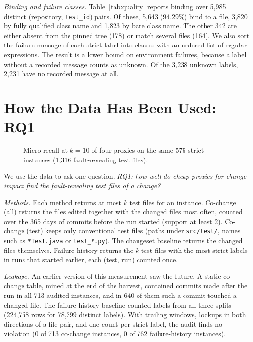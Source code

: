 \documentclass[10pt,conference]{IEEEtran}
\begin{document}
\textit{Binding and failure classes.} Table~\ref{tab:quality} reports binding over 5,985 distinct (repository, \texttt{test\_id}) pairs. Of these, 5,643 (94.29\%) bind to a file, 3,820 by fully qualified class name and 1,823 by bare class name. The other 342 are either absent from the pinned tree (178) or match several files (164). We also sort the failure message of each strict label into classes with an ordered list of regular expressions. The result is a lower bound on environment failures, because a label without a recorded message counts as unknown. Of the 3,238 unknown labels, 2,231 have no recorded message at all.

\section{How the Data Has Been Used: RQ1}
\label{sec:rq1}

\begin{figure}[t]
\centering
\vspace{-4pt}
\resizebox{0.65\columnwidth}{!}{}
\vspace{-6pt}
\caption{Micro recall at $k=10$ of four proxies on the same 576 strict instances (1,316 fault-revealing test files).}
\label{fig:rq1}
\vspace{-6pt}
\end{figure}

We use the data to ask one question. \textit{RQ1: how well do cheap proxies for change impact find the fault-revealing test files of a change?}

\textit{Methods.} Each method returns at most $k$ test files for an instance. Co-change (all) returns the files edited together with the changed files most often, counted over the 365 days of commits before the run started (support at least 2). Co-change (test) keeps only conventional test files (paths under \texttt{src/test/}, names such as \texttt{*Test.java} or \texttt{test\_*.py}). The changeset baseline returns the changed files themselves. Failure history returns the $k$ test files with the most strict labels in runs that started earlier, each (test, run) counted once.

\textit{Leakage.} An earlier version of this measurement saw the future. A static co-change table, mined at the end of the harvest, contained commits made after the run in all 713 audited instances, and in 640 of them such a commit touched a changed file. The failure-history baseline counted labels from all three splits (224,758 rows for 78,399 distinct labels). With trailing windows, lookups in both directions of a file pair, and one count per strict label, the audit finds no violation (0 of 713 co-change instances, 0 of 762 failure-history instances).
\end{document}
